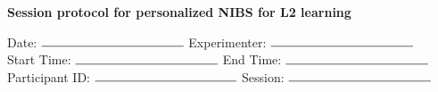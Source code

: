 \documentclass[journal, onecolumn, 12pt]{IEEEtran}
\title{}
\begin{document}
	
	
	
	\begin{center}
		{ \Large  
			\textbf{Session protocol for personalized NIBS for L2 learning}
		}
	\end{center}
	
\vspace{.5cm}

\hspace{1cm} Date:   \hspace{1.4cm}  $\rule{4cm}{0.15mm}$ \hfill Experimenter: $\rule{4cm}{0.15mm}$ \hspace{1cm} \\ 


\hspace{1cm} Start Time: \hspace{.45cm}  $\rule{4cm}{0.15mm}$ \hfill End Time:  \hspace{.45cm} $\rule{4cm}{0.15mm}$ \hspace{1cm} \\ 

\hspace{1cm} Participant ID:  $\rule{4cm}{0.15mm}$ \hfill Session:  \hspace{.85cm} $\rule{4cm}{0.15mm}$ \hspace{1cm} \\ 
\end{document}
